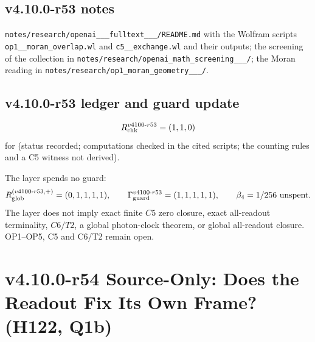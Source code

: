 \subsection*{v4.10.0-r53 notes}
\label{subsec:v4100-r53-notes}

\texttt{notes/\allowbreak research/\allowbreak openai\_\_\_\allowbreak fulltext\_\_\_/\allowbreak README.md} with the Wolfram scripts
\texttt{op1\_\_\allowbreak moran\_\allowbreak overlap.wl} and \texttt{c5\_\_\allowbreak exchange.wl} and their outputs; the screening of the collection in
\texttt{notes/\allowbreak research/\allowbreak openai\_\allowbreak math\_\allowbreak screening\_\_\_/}; the Moran reading in
\texttt{notes/\allowbreak research/\allowbreak op1\_\allowbreak moran\_\allowbreak geometry\_\_\_/}.

\subsection*{v4.10.0-r53 ledger and guard update}
\label{subsec:v4100-r53-ledger-guard}

\[
R_{\rm chk}^{v4100\text{-}r53}=(1,1,0)
\]
for (status recorded; computations checked in the cited scripts; the counting rules and a C5 witness not derived).

The layer spends no guard:
\[
R_{\rm glob}^{(v4100\text{-}r53,+)}=(0,1,1,1,1),
\qquad
\Gamma_{\rm guard}^{v4100\text{-}r53}=(1,1,1,1,1),
\qquad
\beta_4=1/256\ \text{unspent}.
\]
The layer does not imply exact finite \(C5\) zero closure, exact all-readout terminality, \(C6/T2\), a global photon-clock theorem,
or global all-readout closure.  OP1--OP5, C5 and C6/T2 remain open.

\clearpage
\section*{v4.10.0-r54 Source-Only: Does the Readout Fix Its Own Frame? (H122, Q1b)}
\label{sec:v4100-r54-readout-frame}

